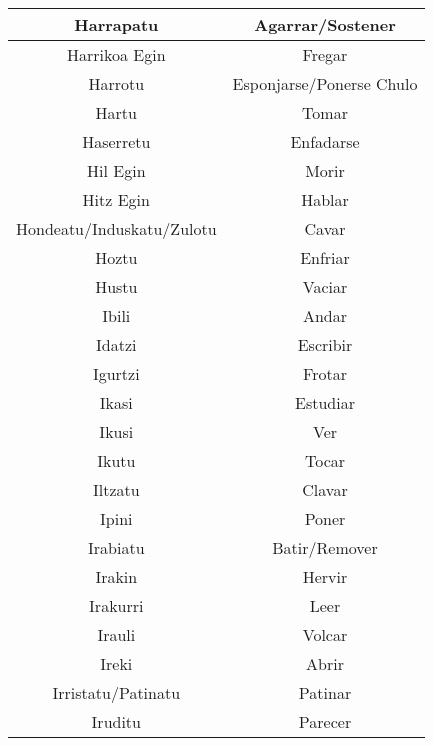 \documentclass[11pt, a4paper]{article}
\begin{document}
\begin{longtable}{cc}
\hline
Harrapatu                  & Agarrar/Sostener            \\ 
\hline
Harrikoa Egin              & Fregar                      \\ 
\hline
Harrotu                    & Esponjarse/Ponerse Chulo    \\ 
\hline
Hartu                      & Tomar                       \\ 
\hline
Haserretu                  & Enfadarse                   \\ 
\hline
Hil Egin                   & Morir                       \\ 
\hline
Hitz Egin                  & Hablar                      \\ 
\hline
Hondeatu/Induskatu/Zulotu  & Cavar                       \\ 
\hline
Hoztu                      & Enfriar                     \\ 
\hline
Hustu                      & Vaciar                      \\ 
\hline
Ibili                      & Andar                       \\ 
\hline
Idatzi                     & Escribir                    \\ 
\hline
Igurtzi                    & Frotar                      \\ 
\hline
Ikasi                      & Estudiar                    \\ 
\hline
Ikusi                      & Ver                         \\ 
\hline
Ikutu                      & Tocar                       \\ 
\hline
Iltzatu                    & Clavar                      \\ 
\hline
Ipini                      & Poner                       \\ 
\hline
Irabiatu                   & Batir/Remover               \\ 
\hline
Irakin                     & Hervir                      \\ 
\hline
Irakurri                   & Leer                        \\ 
\hline
Irauli                     & Volcar                      \\ 
\hline
Ireki                      & Abrir                       \\ 
\hline
Irristatu/Patinatu         & Patinar                     \\ 
\hline
Iruditu                    & Parecer                     \\ 

\end{longtable}
\end{document}
